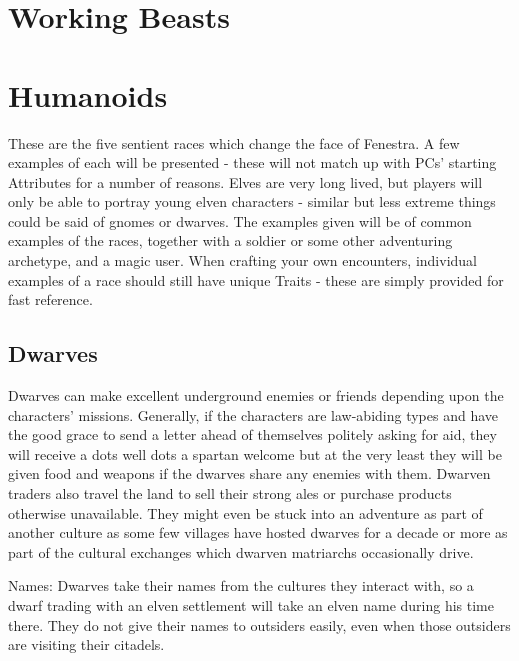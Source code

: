 \section{Working Beasts}

\label{horse} 
\horse

\label{hunting_dogs}
\huntingdog

\label{war_horses}
\section{Humanoids}

These are the five sentient races which change the face of Fenestra.  A few examples of each will be presented - these will not match up with PCs' starting Attributes for a number of reasons.  Elves are very long lived, but players will only be able to portray young elven characters - similar but less extreme things could be said of gnomes or dwarves.  The examples given will be of common examples of the races, together with a soldier or some other adventuring archetype, and a magic user.  When crafting your own encounters, individual examples of a race should still have unique Traits - these are simply provided for fast reference.

\subsection{Dwarves}

Dwarves can make excellent underground enemies or friends depending upon the characters' missions.  Generally, if the characters are law-abiding types and have the good grace to send a letter ahead of themselves politely asking for aid, they will receive a dots well dots a spartan welcome but at the very least they will be given food and weapons if the dwarves share any enemies with them.  Dwarven traders also travel the land to sell their strong ales or purchase products otherwise unavailable.  They might even be stuck into an adventure as part of another culture as some few villages have hosted dwarves for a decade or more as part of the cultural exchanges which dwarven matriarchs occasionally drive.

	Names: Dwarves take their names from the cultures they interact with, so a dwarf trading with an elven settlement will take an elven name during his time there.  They do not give their names to outsiders easily, even when those outsiders are visiting their citadels.

